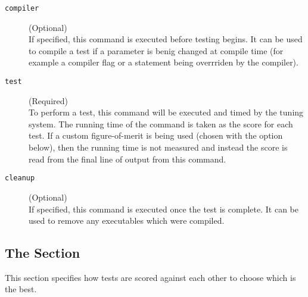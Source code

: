 \documentclass[a4paper, draft]{article}
\begin{document}
\begin{description}

    \item[\texttt{compiler}] (Optional) \\
        If specified, this command is executed before testing begins. 
        It can be used to compile a test if a parameter is benig changed at 
        compile time (for example a compiler flag or a  
        statement being overrriden by the compiler).

    \item[\texttt{test}] (Required) \\
        To perform a test, this command will be executed and timed by the 
        tuning system. The running time of the command is taken as the score 
        for each test. If a custom figure-of-merit is being used (chosen with 
        the  option below), then the running time is not 
        measured and instead the score is read from the final line of output 
        from this command.

    \item[\texttt{cleanup}] (Optional) \\
        If specified, this command is executed once the test is complete. 
        It can be used to remove any executables which were compiled.

\end{description}




\subsection{The \confsnippet{[scoring]} Section}
This section specifies how tests are scored against each other to choose 
which is the best.
\end{document}
